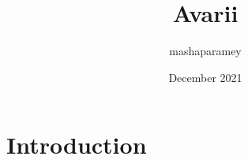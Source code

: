\documentclass{article}
\title{Avarii}
\author{mashaparamey}
\date{December 2021}
\begin{document}
\maketitle

\section{Introduction}

\end{document}
